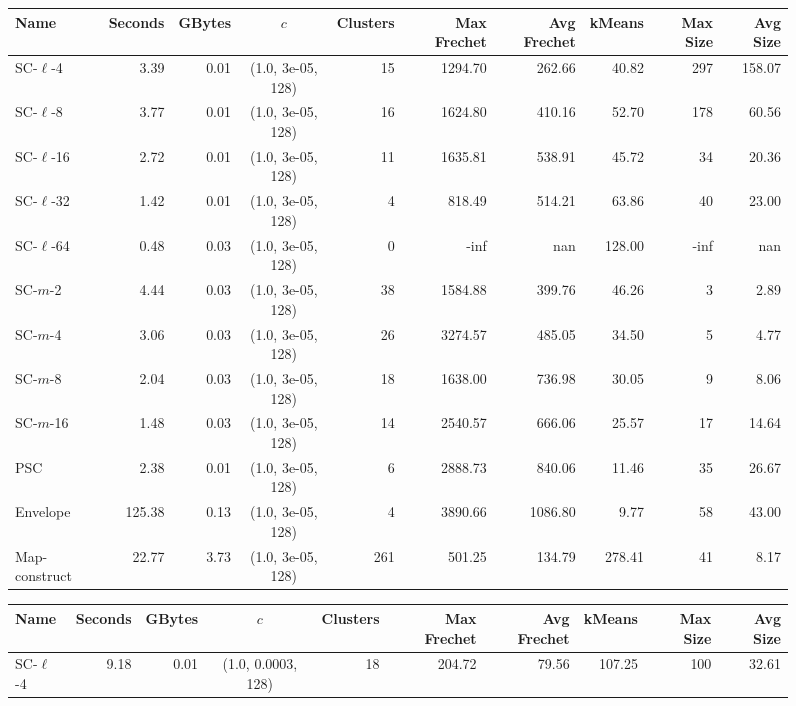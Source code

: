 \begin{figure} \begin{center}
        \begin{minipage}{\textwidth}
    {
    \begin{tabular}{@{}lrrcrrrrrr@{}}
        \toprule
        Name & Seconds & GBytes & $c$ & Clusters & Max Frechet & Avg Frechet & kMeans & Max Size & Avg Size\\
        \midrule
        SC-$\ell$-4 & 3.39 & 0.01 & (1.0, 3e-05, 128) & 15 & 1294.70 & 262.66 & 40.82 & 297 & 158.07\\
        SC-$\ell$-8 & 3.77 & 0.01 & (1.0, 3e-05, 128) & 16 & 1624.80 & 410.16 & 52.70 & 178 & 60.56\\
        SC-$\ell$-16 & 2.72 & 0.01 & (1.0, 3e-05, 128) & 11 & 1635.81 & 538.91 & 45.72 & 34 & 20.36\\
        SC-$\ell$-32 & 1.42 & 0.01 & (1.0, 3e-05, 128) & 4 & 818.49 & 514.21 & 63.86 & 40 & 23.00\\
        SC-$\ell$-64 & 0.48 & 0.03 & (1.0, 3e-05, 128) & 0 & -inf & nan & 128.00 & -inf & nan\\
        SC-$m$-2 & 4.44 & 0.03 & (1.0, 3e-05, 128) & 38 & 1584.88 & 399.76 & 46.26 & 3 & 2.89\\
        SC-$m$-4 & 3.06 & 0.03 & (1.0, 3e-05, 128) & 26 & 3274.57 & 485.05 & 34.50 & 5 & 4.77\\
        SC-$m$-8 & 2.04 & 0.03 & (1.0, 3e-05, 128) & 18 & 1638.00 & 736.98 & 30.05 & 9 & 8.06\\
        SC-$m$-16 & 1.48 & 0.03 & (1.0, 3e-05, 128) & 14 & 2540.57 & 666.06 & 25.57 & 17 & 14.64\\
        PSC & 2.38 & 0.01 & (1.0, 3e-05, 128) & 6 & 2888.73 & 840.06 & 11.46 & 35 & 26.67\\
        Envelope & 125.38 & 0.13 & (1.0, 3e-05, 128) & 4 & 3890.66 & 1086.80 & 9.77 & 58 & 43.00\\
        Map-construct & 22.77 & 3.73 & (1.0, 3e-05, 128) & 261 & 501.25 & 134.79 & 278.41 & 41 & 8.17\\
        \bottomrule
    \end{tabular}}
    {
    \begin{tabular}{@{}lrrcrrrrrr@{}}
        \toprule
        Name & Seconds & GBytes & $c$ & Clusters & Max Frechet & Avg Frechet & kMeans & Max Size & Avg Size\\
        \midrule
        SC-$\ell$-4 & 9.18 & 0.01 & (1.0, 0.0003, 128) & 18 & 204.72 & 79.56 & 107.25 & 100 & 32.61\\

\end{tabular}}
\end{minipage}
\end{center}
\end{figure}
